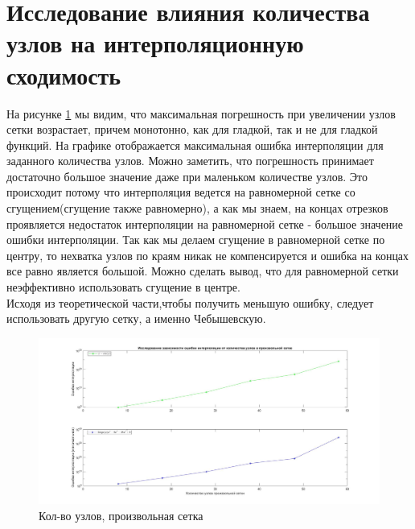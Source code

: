 \documentclass[a4paper]{article}
\begin{document}
\section{Исследование влияния количества узлов на интерполяционную сходимость} 
На рисунке \ref{Рис4} мы видим, что максимальная погрешность при увеличении узлов сетки возрастает, причем монотонно, как для гладкой, так и не для гладкой функций. На графике отображается максимальная ошибка интерполяции для заданного количества узлов. Можно заметить, что погрешность принимает достаточно большое значение даже при маленьком количестве узлов. Это происходит потому что интерполяция ведется на равномерной сетке со сгущением(сгущение также равномерно), а как мы знаем, на концах отрезков проявляется недостаток интерполяции на равномерной сетке - большое значение ошибки интерполяции. Так как мы делаем сгущение в равномерной сетке по центру, то нехватка узлов по краям никак не компенсируется и ошибка на концах все равно является большой.  Можно сделать вывод, что для равномерной сетки неэффективно использовать сгущение в центре.\\
Исходя из теоретической части,чтобы получить меньшую ошибку, следует использовать другую сетку, а именно Чебышевскую.
\begin{figure}[h!]
\begin{center}
\includegraphics[scale=0.3]{кол-во узлов Произвольная.jpg} 
\end{center}
\caption{Кол-во узлов, произвольная сетка} \label{Рис4}
\end{figure}\\
\end{document}
